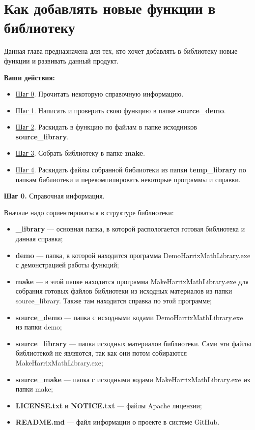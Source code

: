 \newpage
\section{Как добавлять новые функции в библиотеку}\label{section_addnew}

Данная глава предназначена для тех, кто хочет добавлять в библиотеку новые функции и развивать данный продукт.

\textbf{Ваши действия:}

\begin{itemize}
\item \hyperref[step0]{Шаг 0}. Прочитать некоторую справочную информацию.
\item \hyperref[step1]{Шаг 1}. Написать и проверить свою функцию в папке \textbf{source\_demo}.
\item \hyperref[step2]{Шаг 2}. Раскидать в функцию по файлам в папке исходников \textbf{source\_library}.
\item \hyperref[step3]{Шаг 3}. Собрать библиотеку в папке \textbf{make}.
\item \hyperref[step4]{Шаг 4}. Раскидать файлы собранной библиотеки из папки \textbf{temp\_library} по папкам библиотеки и перекомпилировать некоторые программы и справки.
\end{itemize}

\textbf{Шаг 0.} \label{step0} Справочная информация.

Вначале надо сориентироваться в структуре библиотеки:
\begin{itemize}
\item \textbf{\_library} --- основная папка, в которой распологается готовая библиотека и данная справка;
\item \textbf{demo} --- папка, в которой находится программа DemoHarrixMathLibrary.exe с демонстрацией работы функций;
\item \textbf{make} --- в этой папке находится программа MakeHarrixMathLibrary.exe для собрания готовых файлов библиотеки из исходных материалов из папки source\_library. Также там находится справка по этой программе;
\item \textbf{source\_demo} --- папка с исходными кодами DemoHarrixMathLibrary.exe из папки demo;
\item \textbf{source\_library} --- папка исходных материалов библиотеки. Сами эти файлы библиотекой не являются, так как они потом собираются MakeHarrixMathLibrary.exe; 
\item \textbf{source\_make} --- папка с исходными кодами MakeHarrixMathLibrary.exe из папки make;
\item \textbf{LICENSE.txt} и \textbf{NOTICE.txt} --- файлы Apache лицензии;
\item \textbf{README.md} --- файл информации о проекте в системе GitHub.
\end{itemize}

